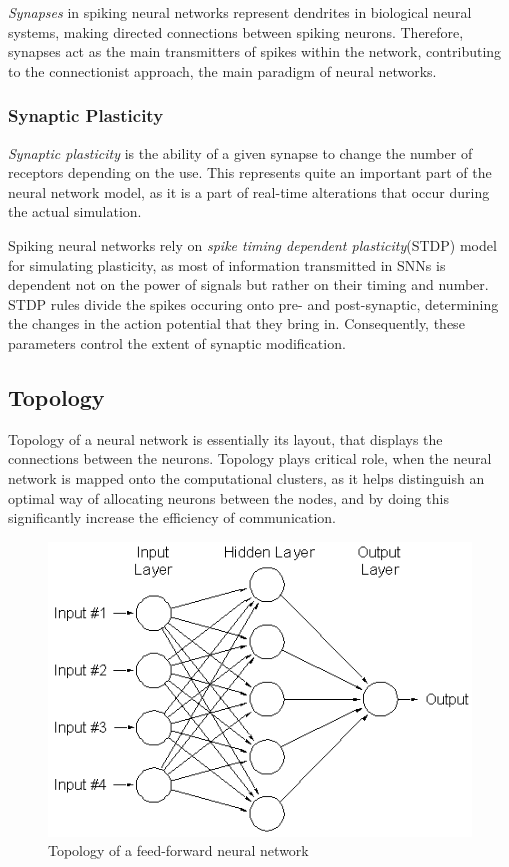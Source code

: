 \documentclass[12pt]{report}
\begin{document}
\emph{Synapses} in spiking neural networks represent dendrites in biological neural systems, making directed connections between spiking neurons. 
Therefore, synapses act as the main transmitters of spikes within the network, contributing to the connectionist approach, the main paradigm of neural networks.

\subsubsection{Synaptic Plasticity}

\emph{Synaptic plasticity} is the ability of a given synapse to change the number of receptors depending on the use.\cite{WulframGerstner2002} This represents quite an
important part of the neural network model, as it is a part of real-time alterations that occur during the actual simulation.

Spiking neural networks rely on \emph{spike timing dependent plasticity}(STDP) model for simulating plasticity, as most of information transmitted in SNNs is dependent not on 
the power of signals but rather on their timing and number. STDP rules divide the spikes occuring onto pre- and post-synaptic, determining the changes in the action potential that
they bring in. Consequently, these parameters control the extent of synaptic modification.\cite{SenSong2000}

\subsection{Topology}

Topology of a neural network is essentially its layout, that displays the connections between the neurons. Topology plays critical role, when 
the neural network is mapped onto the computational clusters, as it helps distinguish an optimal way of allocating neurons between the nodes,
and by doing this significantly increase the efficiency of communication.

\begin{figure}[h]
\begin{center}
\includegraphics[scale = 0.3]{images/topology.png}
\end{center}
\caption{Topology of a feed-forward neural network\cite{Tan2006}}
\end{figure}
\end{document}
